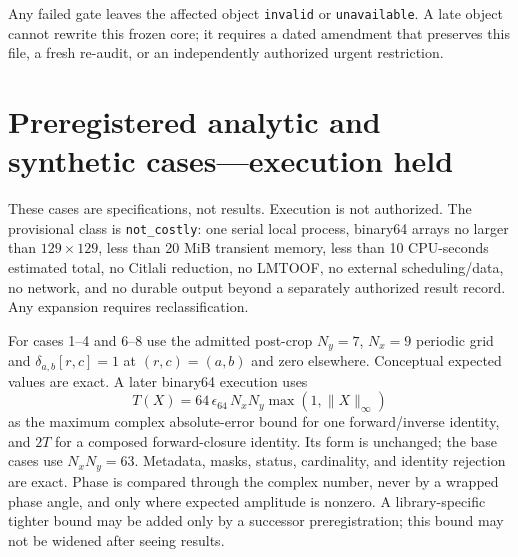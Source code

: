 \documentclass[11pt]{article}
\newcommand{\NA}{\texttt{unavailable}}
\begin{document}
Any failed gate leaves the affected object \texttt{invalid} or \NA.  A late
object cannot rewrite this frozen core; it requires a dated amendment that
preserves this file, a fresh re-audit, or an independently authorized urgent
restriction.

\section{Preregistered analytic and synthetic cases---execution held}

These cases are specifications, not results.  Execution is not authorized.
The provisional class is \texttt{not\_costly}: one serial local process,
binary64 arrays no larger than $129\times129$, less than 20 MiB transient
memory, less than 10 CPU-seconds estimated total, no Citlali reduction, no
LMTOOF, no external scheduling/data, no network, and no durable output beyond
a separately authorized result record.  Any expansion requires
reclassification.

For cases 1--4 and 6--8 use the admitted post-crop
$N_y=7$, $N_x=9$ periodic grid and
$\delta_{a,b}[r,c]=1$ at $(r,c)=(a,b)$ and zero elsewhere.  Conceptual expected
values are exact.  A later binary64 execution uses
\[
 T(X)=64\,\epsilon_{64}\,N_xN_y
 \max(1,\|X\|_\infty)
\]
as the maximum complex absolute-error bound for one forward/inverse identity,
and $2T$ for a composed forward-closure identity.  Its form is unchanged; the
base cases use $N_xN_y=63$.  Metadata, masks, status,
cardinality, and identity rejection are exact.  Phase is compared through the
complex number, never by a wrapped phase angle, and only where expected
amplitude is nonzero.  A library-specific tighter bound may be added only by a
successor preregistration; this bound may not be widened after seeing results.
\end{document}
